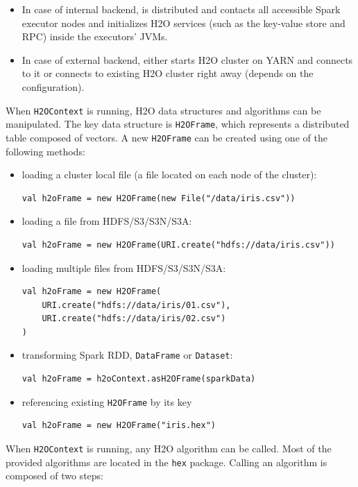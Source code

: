 \documentclass{standalone}
\begin{document}
\begin{itemize}
 \item In case of internal backend, is distributed and contacts all accessible Spark executor nodes and initializes H2O services (such as the key-value store and RPC) inside the executors' JVMs.
 \item In case of external backend, either starts H2O cluster on YARN and connects to it or connects to existing H2O cluster right away (depends on the configuration).
\end{itemize}

\newpage
When \texttt{H2OContext} is running, H2O data structures and algorithms can be manipulated. The key data structure is \texttt{H2OFrame}, which represents a distributed table composed of vectors. A new \texttt{H2OFrame} can be created using one of the following methods:
\begin{itemize}
	\item loading a cluster local file (a file located on each node of the cluster):
\begin{lstlisting}[style=Scala]
val h2oFrame = new H2OFrame(new File("/data/iris.csv"))
\end{lstlisting}
	\item loading a file from HDFS/S3/S3N/S3A:
\begin{lstlisting}[style=Scala]
val h2oFrame = new H2OFrame(URI.create("hdfs://data/iris.csv"))
\end{lstlisting}
	\item loading multiple files from HDFS/S3/S3N/S3A:
\begin{lstlisting}[style=Scala]
val h2oFrame = new H2OFrame(
    URI.create("hdfs://data/iris/01.csv"),
    URI.create("hdfs://data/iris/02.csv")
)
\end{lstlisting}
	\item transforming Spark RDD, \texttt{DataFrame} or \texttt{Dataset}:
\begin{lstlisting}[style=Scala]
val h2oFrame = h2oContext.asH2OFrame(sparkData)
\end{lstlisting}
	\item referencing existing \texttt{H2OFrame} by its key
\begin{lstlisting}[style=Scala]
val h2oFrame = new H2OFrame("iris.hex")
\end{lstlisting}		
\end{itemize}


When \texttt{H2OContext} is running, any H2O algorithm can be called. Most of the provided algorithms are located in the \texttt{hex} package. Calling an algorithm is composed of two steps:
\end{document}
